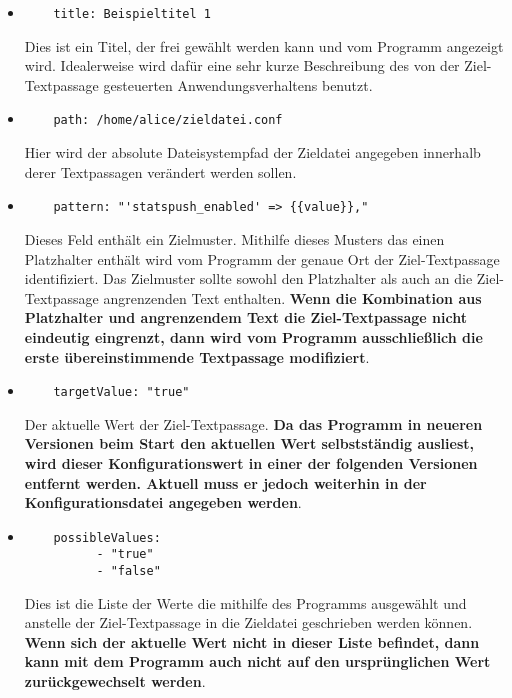 \begin{itemize}
  \item \begin{verbatim}
    title: Beispieltitel 1
  \end{verbatim}
        Dies ist ein Titel, der frei gewählt werden kann und vom Programm angezeigt
        wird. Idealerweise wird dafür eine sehr kurze Beschreibung des von der
        Ziel-\gls{Textpassage} gesteuerten Anwendungsverhaltens benutzt.
  \item \begin{verbatim}
    path: /home/alice/zieldatei.conf
  \end{verbatim}
        Hier wird der absolute Dateisystempfad der Zieldatei angegeben innerhalb
        derer \gls{Textpassage}n  verändert werden sollen.
  \item \begin{verbatim}
    pattern: "'statspush_enabled' => {{value}},"
  \end{verbatim}
        Dieses Feld enthält ein \gls{Zielmuster}. Mithilfe dieses Musters das einen
        \gls{Platzhalter} enthält wird vom Programm der genaue Ort der Ziel-\gls{Textpassage}
        identifiziert. Das \gls{Zielmuster} sollte sowohl den \gls{Platzhalter}
        als auch an die Ziel-\gls{Textpassage} angrenzenden Text enthalten.
        \textbf{Wenn die Kombination aus \gls{Platzhalter} und angrenzendem Text
          die Ziel-\gls{Textpassage} nicht eindeutig eingrenzt, dann wird vom
          Programm ausschließlich die erste übereinstimmende \gls{Textpassage}
          modifiziert}.
  \item \begin{verbatim}
    targetValue: "true"
  \end{verbatim}
        Der aktuelle Wert der Ziel-\gls{Textpassage}.
        \textbf{Da das Programm in neueren Versionen beim Start den aktuellen
          Wert selbstständig ausliest, wird dieser Konfigurationswert in einer
          der folgenden Versionen entfernt werden. Aktuell muss er jedoch weiterhin
          in der Konfigurationsdatei angegeben werden}.
  \item \begin{verbatim}
    possibleValues:
          - "true"
          - "false"
  \end{verbatim}
        Dies ist die Liste der Werte die mithilfe des Programms ausgewählt und
        anstelle der Ziel-\gls{Textpassage} in die Zieldatei geschrieben werden
        können. \textbf{Wenn sich der aktuelle Wert nicht in dieser Liste befindet,
          dann kann mit dem Programm auch nicht auf den ursprünglichen Wert
          zurückgewechselt werden}.
\end{itemize}